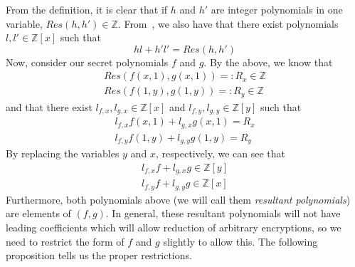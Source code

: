 \documentclass[11pt]{report}
\newcommand{\Z}{\mathbb{Z}}
\newcommand{\Zx}{\mathbb{Z}[x]}
\newcommand{\Zy}{\mathbb{Z}[y]}
\begin{document}
From the definition, it is clear that if $h$ and $h'$ are integer polynomials in one variable, $Res(h,h') \in \Z$. From~\cite{lang-algebra}, we also have that there exist polynomials $l,l'\in \Zx$ such that
\[hl+h'l' = Res(h,h') \]
Now, consider our secret polynomials $f$ and $g$. By the above, we know that
\begin{align*}
Res(f(x,1),g(x,1)) =: R_x \in \Z\\
Res(f(1,y),g(1,y)) =: R_y \in \Z
\end{align*}
and that there exist $l_{f,x}, l_{g,x}\in \Zx$ and $l_{f,y}, l_{g,y}\in \Zy$ such that
\begin{align*}
l_{f,x}f(x,1)+l_{g,x}g(x,1) = R_x\\
l_{f,y}f(1,y)+l_{g,y}g(1,y) = R_y
\end{align*}
By replacing the variables $y$ and $x$, respectively, we can see that
\begin{align*}
l_{f,x}f+l_{g,x}g \in \Zy\\
l_{f,y}f+l_{g,y}g \in \Zx
\end{align*}
Furthermore, both polynomials above (we will call them \emph{resultant polynomials}) are elements of $(f,g)$. In general, these resultant polynomials will not have leading coefficients which will allow reduction of arbitrary encryptions, so we need to restrict the form of $f$ and $g$ slightly to allow this. The following proposition tells us the proper restrictions.
\end{document}
